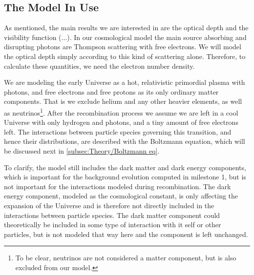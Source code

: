 \documentclass[10pt,a4paper]{article}
\begin{document}
\subsection{The Model In Use}
\label{subsec:Theory/Model}
As mentioned, the main results we are interested in are the optical depth and the visibility function (...). In our cosmological model the main source absorbing and disrupting photons are Thompson scattering with free electrons. We will model the optical depth simply according to this kind of scattering alone. Therefore, to calculate these quantities, we need the electron number density.

We are modeling the early Universe as a hot, relativistic primordial plasma with photons, and free electrons and free protons as its only ordinary matter components. That is we exclude helium and any other heavier elements, as well as neutrinos\footnote{To be clear, neutrinos are not  considered a matter component, but is also excluded from our model.}.
After the recombination process we assume we are left in a cool Universe with only hydrogen and photons, and a tiny amount of free electrons left. The interactions between particle species governing this transition, and hence their distributions, are described with the Boltzmann equation, which will be discussed next in \cref{subsec:Theory/Boltzmann eq}.

To clarify, the model still includes the dark matter and dark energy components, which is important for the background evolution computed in milestone 1, but is not important for the interactions modeled during recombination. The dark energy component, modeled as the cosmological constant, is only affecting the expansion of the Universe and is therefore not directly included in the interactions between particle species. The dark matter component could theoretically be included in some type of interaction with it self or other particles, but is not modeled that way here and the component is left unchanged.

\end{document}
